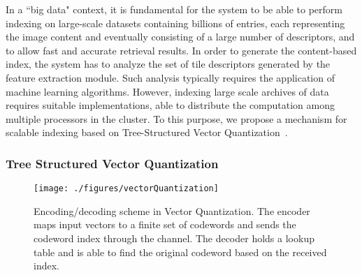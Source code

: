 In a ``big data" context, it is fundamental for the system to be able to perform indexing on large-scale datasets containing billions of entries, each representing the image content and eventually consisting of a large number of descriptors, and to allow fast and accurate retrieval results.
In order to generate the content-based index, the system has to analyze the set of tile descriptors generated by the feature extraction module.
Such analysis typically requires the application of machine learning algorithms.
However, indexing large scale archives of data requires suitable implementations, able to distribute the computation among multiple processors in the cluster. To this purpose, we propose a mechanism for scalable indexing based on Tree-Structured Vector Quantization~\cite{gersho1992vector}. 






















\subsubsection{Tree Structured Vector Quantization}



\begin{figure}[t]
	\centering
\texttt{[image: ./figures/vectorQuantization]}
	\caption{Encoding/decoding scheme in Vector Quantization. The encoder maps input vectors to a finite set of codewords and sends the codeword index through the channel. The decoder holds a lookup table and is able to find the original codeword based on the received index.}
	\label{fig:vectorQuantization}
\end{figure}

